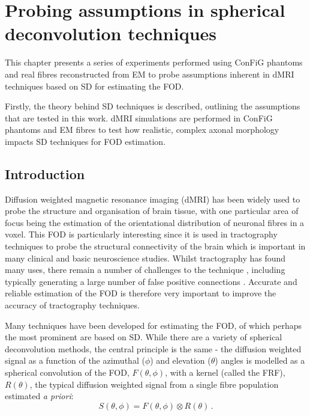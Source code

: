 \chapter{Probing assumptions in spherical deconvolution techniques}
\label{chap:frf_experiment}

\chaptertoc{}

\begin{chapterabstract}
This chapter presents a series of experiments performed using \acs{ConFiG} phantoms and real fibres reconstructed from \ac{EM} to probe assumptions inherent in \ac{dMRI} techniques based on \ac{SD} for estimating the \ac{FOD}.

Firstly, the theory behind \ac{SD} techniques is described, outlining the assumptions that are tested in this work. \ac{dMRI} simulations are performed in \acs{ConFiG} phantoms and \ac{EM} fibres to test how realistic, complex axonal morphology impacts \ac{SD} techniques for \ac{FOD} estimation. 
\end{chapterabstract}


\section{Introduction}
\label{sec:frf_introduction}
Diffusion weighted magnetic resonance imaging (dMRI) has been widely used to probe the structure and organisation of brain tissue, with one particular area of focus being the estimation of the orientational distribution of neuronal fibres in a voxel. This \ac{FOD} is particularly interesting since it is used in tractography techniques to probe the structural connectivity of the brain which is important in many clinical and basic neuroscience studies\cite{DellAcqua2019,Johansen-Berg2006,Catani2013}.
Whilst tractography has found many uses, there remain a number of challenges to the technique \cite{Jbabdi2011}, including typically generating a large number of false positive connections \cite{Maier-Hein2017}.
Accurate and reliable estimation of the \ac{FOD} is therefore very important to improve the accuracy of tractography techniques. 


Many techniques have been developed for estimating the \acl{FOD}, of which perhaps the most prominent are based on \acf{SD}. While there are a variety of spherical deconvolution methods, the central principle is the same - the diffusion weighted signal as a function of the azimuthal ($\phi$) and elevation ($\theta$) angles is modelled as a spherical convolution of the \ac{FOD}, $F(\theta,\phi)$, with a kernel (called the \ac{FRF}), $R(\theta)$, the typical diffusion weighted signal from a single fibre population estimated \emph{a priori}:
\begin{equation}
  S(\theta, \phi) = F(\theta, \phi) \otimes R(\theta) \,.
  \label{eq:spherical_conv}
\end{equation}

